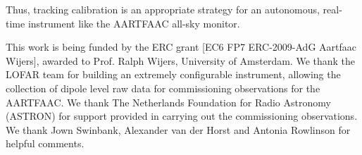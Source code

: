 \documentclass{aa}
\begin{document}
Thus,  tracking calibration  is an appropriate  strategy for  an autonomous,
real-time instrument like the \mbox{AARTFAAC} all-sky monitor.

\begin {acknowledgements}
This work is being funded by the ERC grant [EC6 FP7 ERC-2009-AdG Aartfaac Wijers], awarded to Prof.  Ralph Wijers,
University of  Amsterdam. We thank the  LOFAR team for  building an extremely
configurable instrument,  allowing the collection  of dipole level raw  data for
commissioning observations for the \mbox{AARTFAAC}. We thank The Netherlands Foundation
for  Radio  Astronomy  (ASTRON)  for   support  provided  in  carrying  out  the
commissioning observations. We thank Jown  Swinbank, Alexander van der Horst and
Antonia Rowlinson for helpful comments.
\end{acknowledgements}


\end{document}
